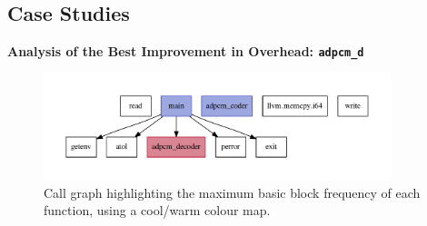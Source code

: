 


\subsection{Case Studies}

\noindent \textbf{Analysis of the Best Improvement in Overhead: \texttt{adpcm\_d}}

\begin{figure}[htb]
    \centering
    \includegraphics[width=0.9\textwidth]{figs/adpcm_d-heat-callgraph.pdf}
    \caption{Call graph highlighting the maximum basic block frequency of each function, using a cool/warm colour map.}
    \label{fig:adpcm_d-heat-callgraph}
\end{figure}

